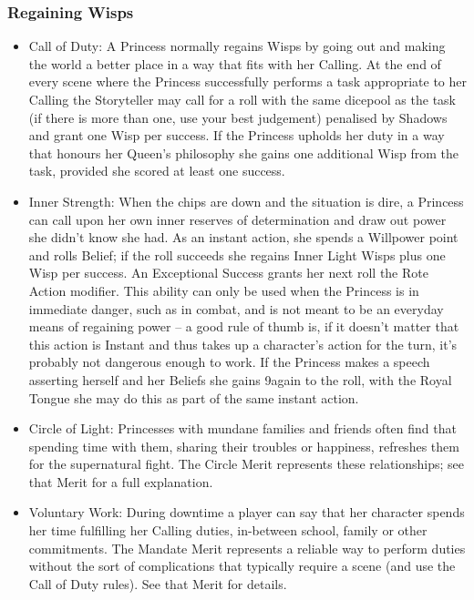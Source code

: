 \subsubsection*{Regaining Wisps}
\begin{itemize}
\item    Call of Duty: A Princess normally regains Wisps by going out and making the world a better place in a way that fits with her Calling. At the end of every scene where the Princess successfully performs a task appropriate to her Calling the Storyteller may call for a roll with the same dicepool as the task (if there is more than one, use your best judgement) penalised by Shadows and grant one Wisp per success. If the Princess upholds her duty in a way that honours her Queen’s philosophy she gains one additional Wisp from the task, provided she scored at least one success.
\item    Inner Strength: When the chips are down and the situation is dire, a Princess can call upon her own inner reserves of determination and draw out power she didn't know she had. As an instant action, she spends a Willpower point and rolls Belief; if the roll succeeds she regains Inner Light Wisps plus one Wisp per success. An Exceptional Success grants her next roll the Rote Action modifier. This ability can only be used when the Princess is in immediate danger, such as in combat, and is not meant to be an everyday means of regaining power -- a good rule of thumb is, if it doesn't matter that this action is Instant and thus takes up a character's action for the turn, it's probably not dangerous enough to work. If the Princess makes a speech asserting herself and her Beliefs she gains 9again to the roll, with the Royal Tongue she may do this as part of the same instant action. 
\item    Circle of Light: Princesses with mundane families and friends often find that spending time with them, sharing their troubles or happiness, refreshes them for the supernatural fight. The Circle Merit represents these relationships; see that Merit for a full explanation. 
\item Voluntary Work: During downtime a player can say that her character spends her time fulfilling her Calling duties, in-between school, family or other commitments. The Mandate Merit represents a reliable way to perform duties without the sort of complications that typically require a scene (and use the Call of Duty rules). See that Merit for details.
\end{itemize}

